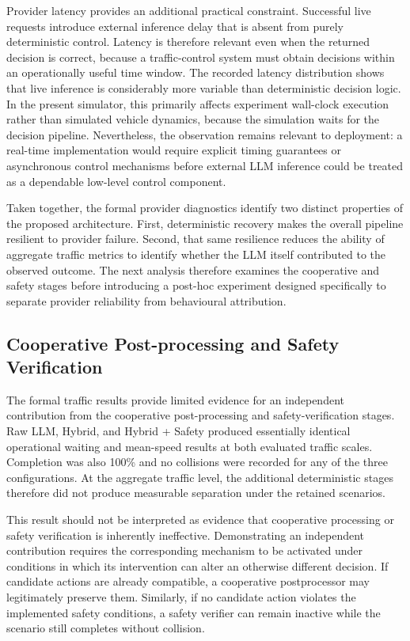 \documentclass[letterpaper,10pt,conference]{ieeeconf}
\begin{document}
Provider latency provides an additional practical constraint. Successful live requests introduce external inference delay that is absent from purely deterministic control. Latency is therefore relevant even when the returned decision is correct, because a traffic-control system must obtain decisions within an operationally useful time window. The recorded latency distribution shows that live inference is considerably more variable than deterministic decision logic. In the present simulator, this primarily affects experiment wall-clock execution rather than simulated vehicle dynamics, because the simulation waits for the decision pipeline. Nevertheless, the observation remains relevant to deployment: a real-time implementation would require explicit timing guarantees or asynchronous control mechanisms before external LLM inference could be treated as a dependable low-level control component.



Taken together, the formal provider diagnostics identify two distinct properties of the proposed architecture. First, deterministic recovery makes the overall pipeline resilient to provider failure. Second, that same resilience reduces the ability of aggregate traffic metrics to identify whether the LLM itself contributed to the observed outcome. The next analysis therefore examines the cooperative and safety stages before introducing a post-hoc experiment designed specifically to separate provider reliability from behavioural attribution.



\subsection{Cooperative Post-processing and Safety Verification}



The formal traffic results provide limited evidence for an independent contribution from the cooperative post-processing and safety-verification stages. Raw LLM, Hybrid, and Hybrid + Safety produced essentially identical operational waiting and mean-speed results at both evaluated traffic scales. Completion was also 100\% and no collisions were recorded for any of the three configurations. At the aggregate traffic level, the additional deterministic stages therefore did not produce measurable separation under the retained scenarios.



This result should not be interpreted as evidence that cooperative processing or safety verification is inherently ineffective. Demonstrating an independent contribution requires the corresponding mechanism to be activated under conditions in which its intervention can alter an otherwise different decision. If candidate actions are already compatible, a cooperative postprocessor may legitimately preserve them. Similarly, if no candidate action violates the implemented safety conditions, a safety verifier can remain inactive while the scenario still completes without collision.
\end{document}
